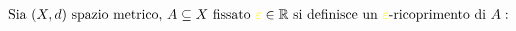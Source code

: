 \documentclass[preview]{standalone}
\begin{document}
\begin{align*}
\text{Sia } (X, d) \text{ spazio metrico, } A \subseteq X \text{ fissato } \textcolor{yellow}{\varepsilon} \in \mathbb{R} \text{ si definisce un } \textcolor{yellow}{\varepsilon}\text{-ricoprimento di } A: \\
\end{align*}
\end{document}

